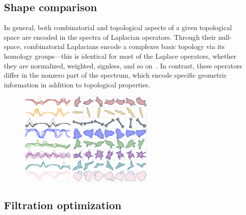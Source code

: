 \documentclass[10pt]{article}
\numberwithin{equation}{section}
\newcommand{\+}{%
	\raisebox{0.18ex}{\scaleobj{0.55}{+}}
}
\theoremstyle{definition}
\theoremstyle{definition}
\begin{document}
%

\subsection{Shape comparison}
In general, both combinatorial and topological aspects of a given topological space are encoded in the spectra of Laplacian operators. 
Through their null-space, combinatorial Laplacians encode a complexes basic topology via its homology groups---this is identical for most of the Laplace operators, whether they are normalized, weighted, signless, and so on~\cite{}.
In contrast, these operators differ in the nonzero part of the spectrum, which encode specific geometric information in addition to topological properties. 

 
\begin{figure}
	\centering
	\includegraphics[width=0.6\textwidth]{shape_signatures}
\end{figure}


\subsection{Filtration optimization}
\end{document}
